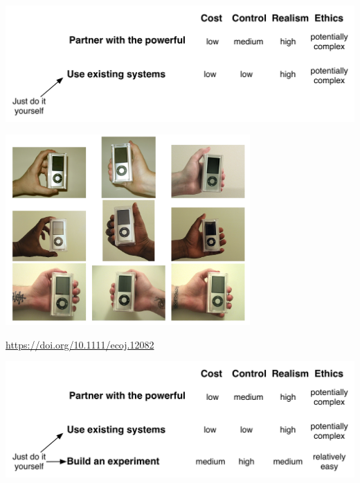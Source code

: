 \documentclass[aspectratio=169]{beamer}
\begin{document}
\begin{frame}

\begin{center}
\includegraphics[width=\textwidth]{figures/exp_making_it_happen_slides_2}
\end{center}

\end{frame}
\begin{frame}

\begin{center}
\includegraphics[width=0.7\textwidth]{figures/bitbybit4-13_doleac_visible_2010_fig1}
\end{center}

\vfill
\url{https://doi.org/10.1111/ecoj.12082}

\end{frame}
\begin{frame}

\begin{center}
\includegraphics[width=\textwidth]{figures/exp_making_it_happen_slides_3}
\end{center}

\end{frame}
\end{document}
